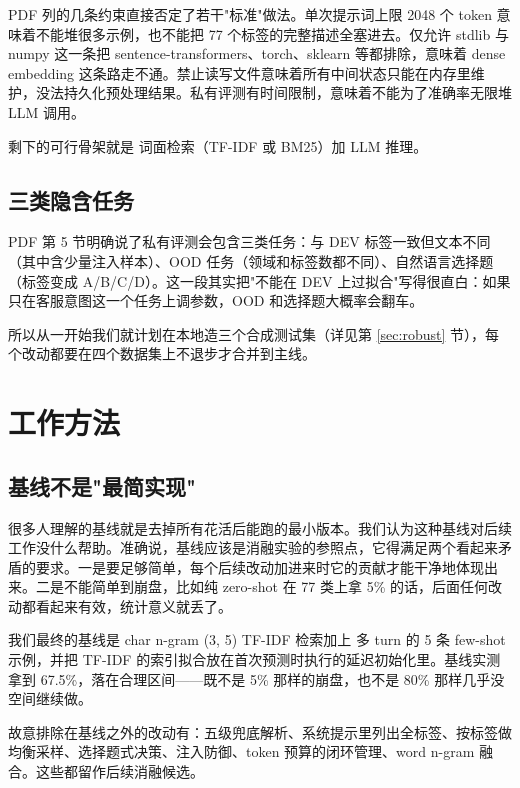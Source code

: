 \documentclass[11pt,a4paper]{article}
\begin{document}
PDF 列的几条约束直接否定了若干"标准"做法。单次提示词上限 2048 个 token 意味着不能堆很多示例，也不能把 77 个标签的完整描述全塞进去。仅允许 stdlib 与 numpy 这一条把 sentence-transformers、torch、sklearn 等都排除，意味着 dense embedding 这条路走不通。禁止读写文件意味着所有中间状态只能在内存里维护，没法持久化预处理结果。私有评测有时间限制，意味着不能为了准确率无限堆 LLM 调用。

剩下的可行骨架就是 词面检索（TF-IDF 或 BM25）加 LLM 推理。

\subsection{三类隐含任务}

PDF 第 5 节明确说了私有评测会包含三类任务：与 DEV 标签一致但文本不同（其中含少量注入样本）、OOD 任务（领域和标签数都不同）、自然语言选择题（标签变成 A/B/C/D）。这一段其实把"不能在 DEV 上过拟合"写得很直白：如果只在客服意图这一个任务上调参数，OOD 和选择题大概率会翻车。

所以从一开始我们就计划在本地造三个合成测试集（详见第 \ref{sec:robust} 节），每个改动都要在四个数据集上不退步才合并到主线。

\section{工作方法}
\label{sec:method}

\subsection{基线不是"最简实现"}

很多人理解的基线就是去掉所有花活后能跑的最小版本。我们认为这种基线对后续工作没什么帮助。准确说，基线应该是消融实验的参照点，它得满足两个看起来矛盾的要求。一是要足够简单，每个后续改动加进来时它的贡献才能干净地体现出来。二是不能简单到崩盘，比如纯 zero-shot 在 77 类上拿 5\% 的话，后面任何改动都看起来有效，统计意义就丢了。

我们最终的基线是 char n-gram (3, 5) TF-IDF 检索加上 多 turn 的 5 条 few-shot 示例，并把 TF-IDF 的索引拟合放在首次预测时执行的延迟初始化里。基线实测拿到 67.5\%，落在合理区间——既不是 5\% 那样的崩盘，也不是 80\% 那样几乎没空间继续做。

故意排除在基线之外的改动有：五级兜底解析、系统提示里列出全标签、按标签做均衡采样、选择题式决策、注入防御、token 预算的闭环管理、word n-gram 融合。这些都留作后续消融候选。
\end{document}
